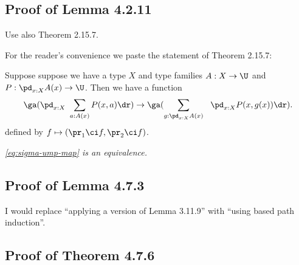 \documentclass[12pt]{article}
\begin{document}
\begin{comment}

\subsection{Lemma 4.2.9}

Let $f:A\to B$. Recall the statement of Lemma 4.2.9: 

If $f$ is invertible, then $\ms{linv}(f)$ and $\ms{rinv}(f)$ are contractible. 

The following slightly stronger statement is an immediate consequence of Exercise 4.5 (see \S\ref{45} p.~\pageref{45} below): 

If $\ell,r:B\to A$ are respectively a left inverse of $f$ and a right inverse of $f$, then $f$ admits an inverse $i:B\to A$, and we have $\ell=i=r$.

\end{comment}


\subsection{Proof of Lemma 4.2.11}\label{4211}

Use also Theorem 2.15.7. 

For the reader's convenience we paste the statement of Theorem 2.15.7:

Suppose suppose we have a type $X$ and type families $A:X\to\U$ and $P:\pd_{x:X}A(x)\to\U$. Then we have a function
\begin{equation}\label{eq:sigma-ump-map}
\ga(\pd_{x:X}\ \sum_{a:A(x)}P(x,a)\dr)\to
\ga(\sum_{g:\pd_{x:X}A(x)}\ \ \pd_{x:X}P(x,g(x))\dr).
\end{equation}
defined by $f\mapsto(\pr_1\ci f,\pr_2\ci f)$.

\nn{} \emph{\eqref{eq:sigma-ump-map} is an equivalence.}


\subsection{Proof of Lemma 4.7.3}

I would replace ``applying a version of Lemma 3.11.9'' with ``using based path induction''.


\subsection{Proof of Theorem 4.7.6}
\end{document}
